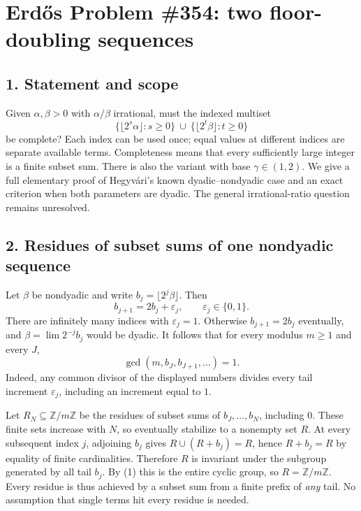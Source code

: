 \section*{Erd\H{o}s Problem \#354: two floor-doubling sequences}
\subsection*{1. Statement and scope}
Given $\alpha,\beta>0$ with $\alpha/\beta$ irrational, must the indexed
multiset
\[
 \{\lfloor2^s\alpha\rfloor:s\ge0\}
 \ \cup\ \{\lfloor2^t\beta\rfloor:t\ge0\}
\]
be complete? Each index can be used once; equal values at different
indices are separate available terms. Completeness means that every
sufficiently large integer is a finite subset sum.
There is also the variant with base $\gamma\in(1,2)$.
We give a full elementary proof of Hegyv\'ari's known
dyadic--nondyadic case and an exact criterion when both parameters
are dyadic. The general irrational-ratio question remains unresolved.

\subsection*{2. Residues of subset sums of one nondyadic sequence}
Let $\beta$ be nondyadic and write $b_j=\lfloor2^j\beta\rfloor$.
Then
\[
 b_{j+1}=2b_j+\varepsilon_j,\qquad\varepsilon_j\in\{0,1\}.
\]
There are infinitely many indices with $\varepsilon_j=1$.
Otherwise $b_{j+1}=2b_j$ eventually, and
$\beta=\lim 2^{-j}b_j$ would be dyadic.
It follows that for every modulus $m\ge1$ and every $J$,
\[
 \gcd(m,b_J,b_{J+1},\ldots)=1.                    \tag{1}
\]
Indeed, any common divisor of the displayed numbers divides every
tail increment $\varepsilon_j$, including an increment equal to $1$.

Let $R_N\subseteq\mathbb Z/m\mathbb Z$ be the residues of subset sums
of $b_J,\ldots,b_N$, including $0$. These finite sets increase with $N$,
so eventually stabilize to a nonempty set $R$. At every subsequent
index $j$, adjoining $b_j$ gives
$R\cup(R+b_j)=R$, hence $R+b_j=R$ by equality of finite cardinalities.
Therefore $R$ is invariant under the subgroup generated by all tail
$b_j$. By (1) this is the entire cyclic group, so $R=\mathbb Z/m\mathbb Z$.
Every residue is thus achieved by a subset sum from a finite prefix
of \emph{any} tail. No assumption that single terms hit every residue
is needed.

